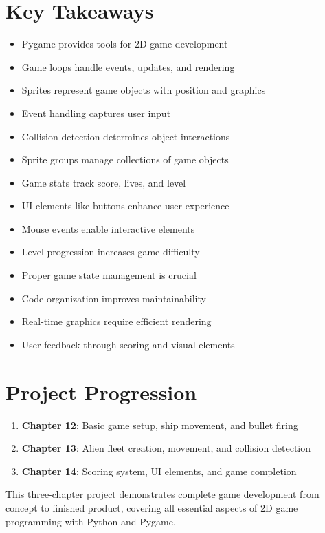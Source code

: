 \section*{Key Takeaways}
\begin{itemize}
    \item Pygame provides tools for 2D game development
    \item Game loops handle events, updates, and rendering
    \item Sprites represent game objects with position and graphics
    \item Event handling captures user input
    \item Collision detection determines object interactions
    \item Sprite groups manage collections of game objects
    \item Game stats track score, lives, and level
    \item UI elements like buttons enhance user experience
    \item Mouse events enable interactive elements
    \item Level progression increases game difficulty
    \item Proper game state management is crucial
    \item Code organization improves maintainability
    \item Real-time graphics require efficient rendering
    \item User feedback through scoring and visual elements
\end{itemize}

\section*{Project Progression}
\begin{enumerate}
    \item \textbf{Chapter 12}: Basic game setup, ship movement, and bullet firing
    \item \textbf{Chapter 13}: Alien fleet creation, movement, and collision detection
    \item \textbf{Chapter 14}: Scoring system, UI elements, and game completion
\end{enumerate}

This three-chapter project demonstrates complete game development from concept to finished product, covering all essential aspects of 2D game programming with Python and Pygame. 